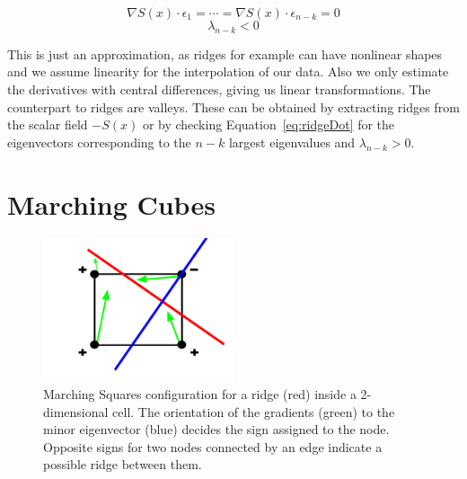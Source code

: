 \begin{equation}\label{eq:ridgeDot}
  \nabla S(x) \cdot \epsilon_1 = \cdots = \nabla S(x) \cdot \epsilon_{n-k} = 0
\end{equation}
\begin{equation}\label{eq:ridgeEV}
  \lambda_{n-k} < 0
\end{equation}

\noindent This is just an approximation, as ridges for example can have
nonlinear shapes and we assume linearity for the interpolation of our
data. Also we only estimate the derivatives with central differences,
giving us linear transformations. The counterpart to ridges are valleys.
These can be obtained by extracting ridges from the scalar field $-S(x)$
or by checking Equation~\ref{eq:ridgeDot} for the eigenvectors
corresponding to the $n-k$ largest eigenvalues and $\lambda_{n-k} > 0$.


\section{Marching Cubes}

\begin{figure}
  \centering
  \includegraphics[width=0.5\textwidth]{Images/MC.pdf}
  \caption{Marching Squares configuration for a ridge (red) inside a
  2-dimensional cell. The orientation of the gradients (green) to the
  minor eigenvector (blue) decides the sign assigned to the node.
  Opposite signs for two nodes connected by an edge indicate a
  possible ridge between them.}
  \label{fig:MC}
\end{figure}


